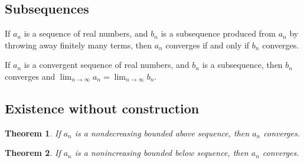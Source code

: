 \documentclass[12pt,letterpaper]{article}
\newtheorem*{theorem*}{Theorem}
\theoremstyle{definition}
\newcommand{\limn}{\displaystyle\lim_{n \to \infty}}
\begin{document}
\subsection*{Subsequences}

If $a_n$ is a sequence of real numbers, and $b_n$ is a subsequence
produced from $a_n$ by throwing away finitely many terms, then $a_n$
converges if and only if $b_n$ converges.

\vspace{1ex}
\noindent
If $a_n$ is a convergent sequence of real numbers, and $b_n$ is a
subsequence, then $b_n$ converges and $\limn a_n = \limn b_n$.

\subsection*{Existence without construction}

\begin{theorem*}
If $a_n$ is a nondecreasing bounded above sequence, then $a_n$ converges.
\end{theorem*}

\begin{theorem*}
If $a_n$ is a nonincreasing bounded below sequence, then $a_n$ converges.
\end{theorem*}
\end{document}
